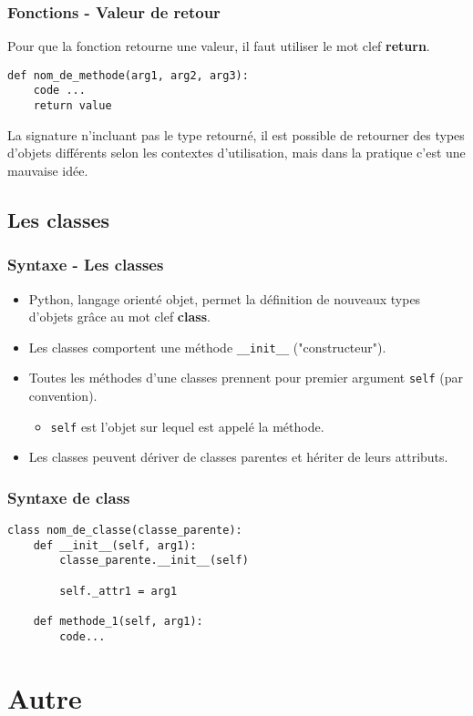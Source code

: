 \begin{frame}[fragile]
  \frametitle{Fonctions - Valeur de retour}
Pour que la fonction retourne une valeur, il faut utiliser le mot clef {\bf return}.
  \begin{lstlisting}
def nom_de_methode(arg1, arg2, arg3):
    code ...
    return value
  \end{lstlisting}

La signature n'incluant pas le type retourné, il est possible de retourner des types d'objets différents selon les contextes d'utilisation, mais dans la pratique c'est une mauvaise idée.
\end{frame}

\subsection{Les classes}
\begin{frame}[fragile]
  \frametitle{Syntaxe - Les classes}
  \begin{itemize}
    \item<1-> Python, langage orienté objet, permet la définition de nouveaux types d'objets grâce au mot clef {\bf class}.
    \item<2-> Les classes comportent une méthode \verb=__init__= ("constructeur").
    \item<3-> Toutes les méthodes d'une classes prennent pour premier argument \verb=self= (par convention).
    \begin{itemize}
      \item<3-> \verb=self= est l'objet sur lequel est appelé la méthode.
    \end{itemize}
    \item<4-> Les classes peuvent dériver de classes parentes et hériter de leurs attributs.
  \end{itemize}
\end{frame}

\begin{frame}[fragile]
  \frametitle{Syntaxe de class}
  \begin{lstlisting}
class nom_de_classe(classe_parente):
    def __init__(self, arg1):
        classe_parente.__init__(self)

        self._attr1 = arg1

    def methode_1(self, arg1):
        code...
  \end{lstlisting}
\end{frame}

\section{Autre}
